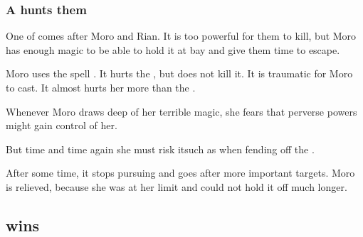 \subsubsection{A \bane hunts them}
One of  comes after Moro and Rian. It is too powerful for them to kill, but Moro has enough magic to be able to hold it at bay and give them time to escape. 

Moro uses the spell . 
It hurts the \bane, but does not kill it. 
It is traumatic for Moro to cast. 
It almost hurts her more than the \bane. 

Whenever Moro draws deep of her terrible magic, she fears that perverse powers might gain control of her. 


But time and time again she must risk it\dash such as when fending off the \bane. 


After some time, it stops pursuing and goes after more important targets. Moro is relieved, because she was at her limit and could not hold it off much longer. 









\subsection[Psyrex wins]{\Psyrex wins}





